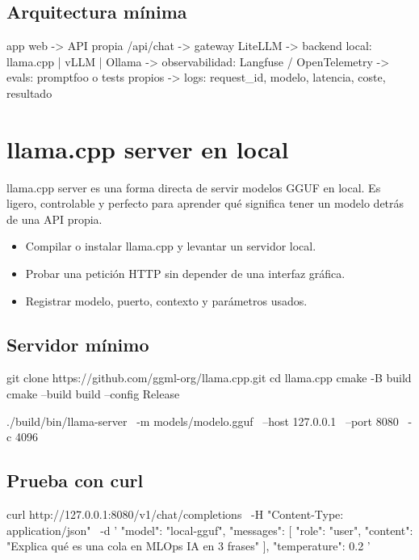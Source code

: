 \documentclass[11pt,a4paper]{book}
\begin{document}
\section{Arquitectura mínima}
\begin{codebox}
app web
  -> API propia /api/chat
  -> gateway LiteLLM
  -> backend local: llama.cpp | vLLM | Ollama
  -> observabilidad: Langfuse / OpenTelemetry
  -> evals: promptfoo o tests propios
  -> logs: request_id, modelo, latencia, coste, resultado
\end{codebox}
\chapter{llama.cpp server en local}
llama.cpp server es una forma directa de servir modelos GGUF en local. Es ligero, controlable y perfecto para aprender qué significa tener un modelo detrás de una API propia.

\begin{itemize}\item Compilar o instalar llama.cpp y levantar un servidor local.\end{itemize}
\begin{itemize}\item Probar una petición HTTP sin depender de una interfaz gráfica.\end{itemize}
\begin{itemize}\item Registrar modelo, puerto, contexto y parámetros usados.\end{itemize}
\section{Servidor mínimo}
\begin{codebox}
git clone https://github.com/ggml-org/llama.cpp.git
cd llama.cpp
cmake -B build
cmake --build build --config Release

./build/bin/llama-server \
  -m models/modelo.gguf \
  --host 127.0.0.1 \
  --port 8080 \
  -c 4096
\end{codebox}
\section{Prueba con curl}
\begin{codebox}
curl http://127.0.0.1:8080/v1/chat/completions \
  -H "Content-Type: application/json" \
  -d '{
    "model": "local-gguf",
    "messages": [
      {"role": "user", "content": "Explica qué es una cola en MLOps IA en 3 frases"}
    ],
    "temperature": 0.2
  }'
\end{codebox}
\end{document}
